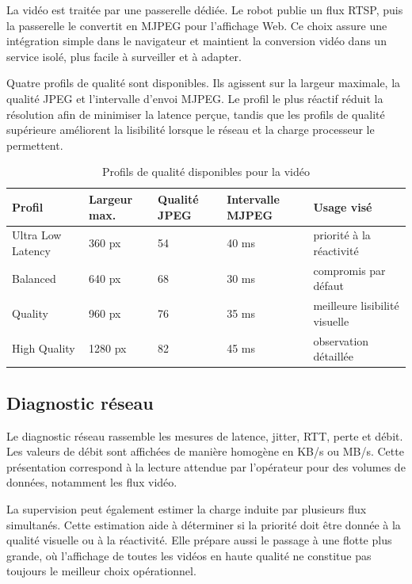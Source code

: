 La vidéo est traitée par une passerelle dédiée. Le robot publie un flux RTSP, puis la passerelle le convertit en MJPEG pour l'affichage Web. Ce choix assure une intégration simple dans le navigateur et maintient la conversion vidéo dans un service isolé, plus facile à surveiller et à adapter.

Quatre profils de qualité sont disponibles. Ils agissent sur la largeur maximale, la qualité JPEG et l'intervalle d'envoi MJPEG. Le profil le plus réactif réduit la résolution afin de minimiser la latence perçue, tandis que les profils de qualité supérieure améliorent la lisibilité lorsque le réseau et la charge processeur le permettent.

\begin{table}[H]
\centering
\small
\renewcommand{\arraystretch}{1.18}
\begin{tabular}{|p{3.2cm}|p{2.3cm}|p{2.5cm}|p{2.8cm}|p{3.6cm}|}
\hline
\textbf{Profil} & \textbf{Largeur max.} & \textbf{Qualité JPEG} & \textbf{Intervalle MJPEG} & \textbf{Usage visé} \\
\hline
Ultra Low Latency & 360 px & 54 & 40 ms & priorité à la réactivité \\
\hline
Balanced & 640 px & 68 & 30 ms & compromis par défaut \\
\hline
Quality & 960 px & 76 & 35 ms & meilleure lisibilité visuelle \\
\hline
High Quality & 1280 px & 82 & 45 ms & observation détaillée \\
\hline
\end{tabular}
\caption{Profils de qualité disponibles pour la vidéo}
\label{tab:v2x_video_profiles}
\end{table}

\subsection{Diagnostic réseau}

Le diagnostic réseau rassemble les mesures de latence, jitter, RTT, perte et débit. Les valeurs de débit sont affichées de manière homogène en KB/s ou MB/s. Cette présentation correspond à la lecture attendue par l'opérateur pour des volumes de données, notamment les flux vidéo.

La supervision peut également estimer la charge induite par plusieurs flux simultanés. Cette estimation aide à déterminer si la priorité doit être donnée à la qualité visuelle ou à la réactivité. Elle prépare aussi le passage à une flotte plus grande, où l'affichage de toutes les vidéos en haute qualité ne constitue pas toujours le meilleur choix opérationnel.

